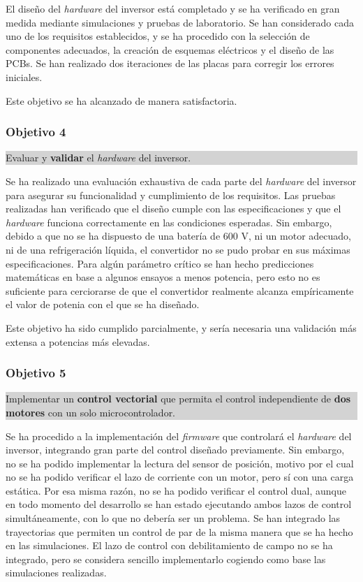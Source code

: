 El diseño del \textit{hardware} del inversor está completado y se ha verificado en gran medida mediante simulaciones y pruebas de laboratorio. Se han considerado cada uno de los requisitos establecidos, y se ha procedido con la selección de componentes adecuados, la creación de esquemas eléctricos y el diseño de las PCBs. Se han realizado dos iteraciones de las placas para corregir los errores iniciales. 

Este objetivo se ha alcanzado de manera satisfactoria.

\subsubsection*{Objetivo 4}
\colorbox{lightgray}{%
	\parbox{\dimexpr\linewidth-2\fboxsep-2\fboxrule}{%
		Evaluar y \textbf{validar} el \textit{hardware} del inversor.%
	}%
}

Se ha realizado una evaluación exhaustiva de cada parte del \textit{hardware} del inversor para asegurar su funcionalidad y cumplimiento de los requisitos. Las pruebas realizadas han verificado que el diseño cumple con las especificaciones y que el \textit{hardware} funciona correctamente en las condiciones esperadas. Sin embargo, debido a que no se ha dispuesto de una batería de 600 V, ni un motor adecuado, ni de una refrigeración líquida, el convertidor no se pudo probar en sus máximas especificaciones. Para algún parámetro crítico se han hecho predicciones matemáticas en base a algunos ensayos a menos potencia, pero esto no es suficiente para cerciorarse de que el convertidor realmente alcanza empíricamente el valor de potenia con el que se ha diseñado.

Este objetivo ha sido cumplido parcialmente, y sería necesaria una validación más extensa a potencias más elevadas.

\subsubsection*{Objetivo 5}
\colorbox{lightgray}{%
	\parbox{\dimexpr\linewidth-2\fboxsep-2\fboxrule}{%
		Implementar un \textbf{control vectorial} que permita el control independiente de \textbf{dos motores} con un solo microcontrolador.%
	}%
}

Se ha procedido a la implementación del \textit{firmware} que controlará el \textit{hardware} del inversor, integrando gran parte del control diseñado previamente. Sin embargo, no se ha podido implementar la lectura del sensor de posición, motivo por el cual no se ha podido verificar el lazo de corriente con un motor, pero sí con una carga estática. Por esa misma razón, no se ha podido verificar el control dual, aunque en todo momento del desarrollo se han estado ejecutando ambos lazos de control simultáneamente, con lo que no debería ser un problema. Se han integrado las trayectorias que permiten un control de par de la misma manera que se ha hecho en las simulaciones. El lazo de control con debilitamiento de campo no se ha integrado, pero se considera sencillo implementarlo cogiendo como base las simulaciones realizadas. 

